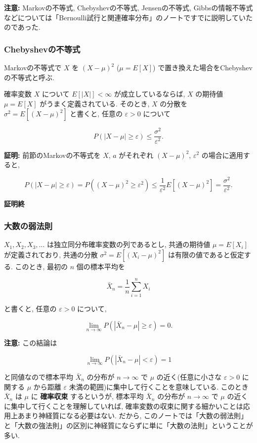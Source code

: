 \documentclass[10pt, a4paper,xelatex,ja=standard]{bxjsarticle}
\newcommand\eps{\varepsilon}
\begin{document}
\textbf{注意:} Markovの不等式, Chebyshevの不等式, Jensenの不等式,
Gibbsの情報不等式などについては「Bernoulli試行と関連確率分布」のノートですでに説明していたのであった.

    \hypertarget{chebyshevux306eux4e0dux7b49ux5f0f}{%
\subsubsection{Chebyshevの不等式}\label{chebyshevux306eux4e0dux7b49ux5f0f}}

Markovの不等式で \(X\) を \((X-\mu)^2\) (\(\mu=E[X]\))
で置き換えた場合をChebyshevの不等式と呼ぶ.

確率変数 \(X\) について \(E[|X|]<\infty\) が成立しているならば, \(X\)
の期待値 \(\mu = E[X]\) がうまく定義されている. そのとき, \(X\) の分散を
\(\sigma^2 = E[(X-\mu)^2]\) と書くと, 任意の \(\eps>0\) について

\[
P(|X-\mu|\ge \eps) \le \frac{\sigma^2}{\eps^2}.
\]

\textbf{証明:} 前節のMarkovの不等式を \(X\), \(a\) がそれぞれ
\((X-\mu)^2\), \(\eps^2\) の場合に適用すると,

\[
P(|X-\mu|\ge \eps) = P((X-\mu)^2 \ge \eps^2) \le \frac{1}{\eps^2}E[(X-\mu)^2] = \frac{\sigma^2}{\eps^2}.
\]

\textbf{証明終}

    \hypertarget{ux5927ux6570ux306eux5f31ux6cd5ux5247}{%
\subsubsection{大数の弱法則}\label{ux5927ux6570ux306eux5f31ux6cd5ux5247}}

\(X_1,X_2,X_3,\ldots\) は独立同分布確率変数の列であるとし, 共通の期待値
\(\mu=E[X_i]\) が定義されており, 共通の分散
\(\sigma^2 = E[(X_i-\mu)^2]\) は有限の値であると仮定する. このとき,
最初の \(n\) 個の標本平均を

\[
\bar{X}_n = \frac{1}{n}\sum_{i=1}^n X_i
\]

と書くと, 任意の \(\eps > 0\) について,

\[
\lim_{n\to\infty} P(|\bar{X}_n - \mu|\ge\eps) = 0.
\]

\textbf{注意:} この結論は

\[
\lim_{n\to\infty} P(|\bar{X}_n - \mu| < \eps) = 1
\]

と同値なので標本平均 \(\bar{X}_n\) の分布が \(n\to\infty\) で \(\mu\)
の近く(任意に小さな \(\eps>0\) に関する \(\mu\) から距離 \(\eps\)
未満の範囲)に集中して行くことを意味している. このとき \(\bar{X}_n\) は
\(\mu\) に \textbf{確率収束} するというが, 標本平均 \(\bar{X}_n\)
の分布が \(n\to\infty\) で \(\mu\)
の近くに集中して行くことを理解していれば,
確率変数の収束に関する細かいことは応用上あまり神経質になる必要はない.
だから,
このノートでは「大数の弱法則」と「大数の強法則」の区別に神経質にならずに単に「大数の法則」ということが多い.
\end{document}
